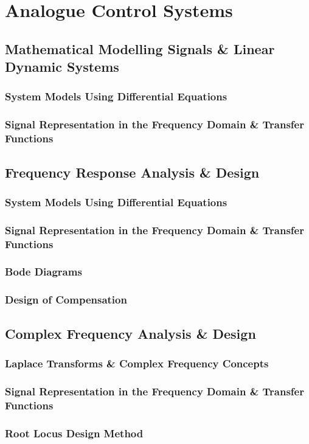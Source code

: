 \vspace{10cm}
\chapter{Analogue Control Systems}


\newpage
\section{Mathematical Modelling Signals \& Linear Dynamic Systems}
\subsection{System Models Using Differential Equations}
\subsection{Signal Representation in the Frequency Domain \& Transfer Functions}

\newpage
\section{Frequency Response Analysis \& Design}
\subsection{System Models Using Differential Equations}
\subsection{Signal Representation in the Frequency Domain \& Transfer Functions}
\subsection{Bode Diagrams}
\subsection{Design of Compensation}

\newpage
\section{Complex Frequency Analysis \& Design}
\subsection{Laplace Transforms \& Complex Frequency Concepts}
\subsection{Signal Representation in the Frequency Domain \& Transfer Functions}
\subsection{Root Locus Design Method}

